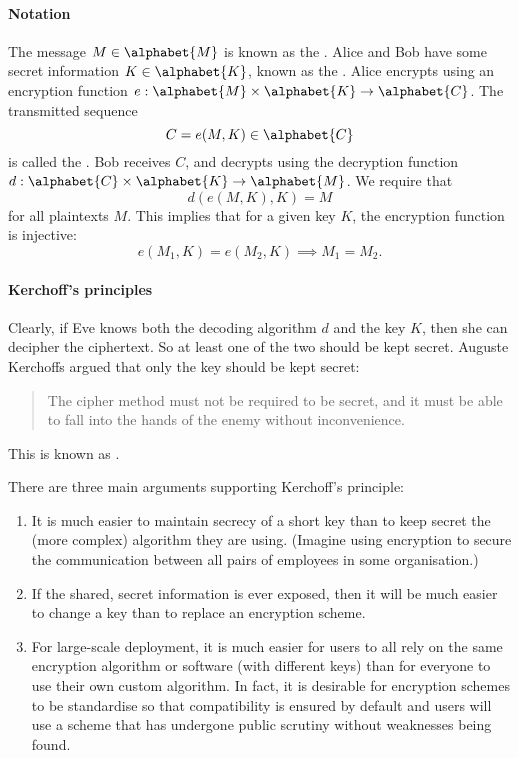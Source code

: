 \documentclass[a4paper, 11pt, openany]{book}
\begin{document}
\paragraph{Notation}

The message $M \in \alphabet{M}$ is known as the . Alice and Bob have some secret information $K \in \alphabet{K}$, known as the .
Alice encrypts using an encryption function $e : \alphabet{M} \times \alphabet{K} \to \alphabet{C}$.
The transmitted sequence
\[
    C = e(M,K) \in \alphabet{C}
\]
is called the . Bob receives $C$, and decrypts using the decryption function $d : \alphabet{C} \times \alphabet{K} \to \alphabet{M}$. We require that
\[
    d( e(M,K), K ) = M
\]
for all plaintexts $M$. This implies that for a given key $K$, the encryption function is injective:
\[
    e(M_1, K) = e(M_2, K) \implies M_1 = M_2.
\]




\paragraph{Kerchoff's principles}

Clearly, if Eve knows both the decoding algorithm $d$ and the key $K$, then she can decipher the ciphertext. So at least one of the two should be kept secret. Auguste Kerchoffs argued that only the key should be kept secret:
\begin{quote}
    The cipher method must not be required to be secret, and it must be able to fall into the hands of the enemy without inconvenience.
\end{quote}
This is known as .

There are three main arguments supporting Kerchoff's principle:
\begin{enumerate}
    \item It is much easier to maintain secrecy of a short key than to keep secret the (more complex) algorithm they are using. (Imagine using encryption to secure the communication between all pairs of employees in some organisation.)

    \item If the shared, secret information is ever exposed, then it will be much easier to change a key than to replace an encryption scheme.

    \item For large-scale deployment, it is much easier for users to all rely on the same encryption algorithm or software (with different keys) than for everyone to use their own custom algorithm. In fact, it is desirable for encryption schemes to be standardise so that compatibility is ensured by default and users will use a scheme that has undergone public scrutiny without weaknesses being found.
\end{enumerate}
\end{document}
